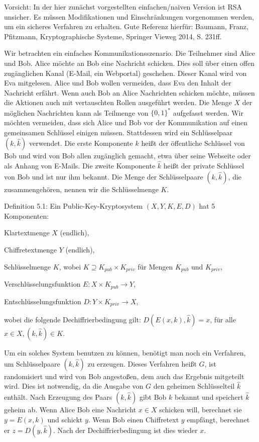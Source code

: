 \documentclass[a4paper]{article}
\begin{document}
\begin{multicols}{3}
        Vorsicht: In der hier zunächst vorgestellten einfachen/naiven Version ist RSA unsicher. Es müssen Modifikationen und Einschränkungen vorgenommen werden, um ein
        sicheres Verfahren zu erhalten. Gute Referenz hierfür: Baumann, Franz, Pfitzmann, Kryptographische Systeme, Springer Vieweg 2014, S. 231ff.

        Wir betrachten ein einfaches Kommunikationsszenario. Die Teilnehmer sind Alice und Bob. Alice möchte an Bob eine Nachricht schicken. Dies soll über einen offen zugänglichen Kanal (E-Mail, ein Webportal) geschehen. Dieser Kanal wird von Eva mitgelesen. Alice und Bob wollen vermeiden, dass Eva den Inhalt der Nachricht erfährt. Wenn auch Bob an Alice Nachrichten schicken möchte, müssen die Aktionen auch mit vertauschten Rollen ausgeführt werden.
        Die Menge $X$ der möglichen Nachrichten kann als Teilmenge von $\{0,1\}^*$ aufgefasst werden. Wir möchten vermeiden, dass sich Alice und Bob vor der Kommunikation auf einen gemeinsamen Schlüssel einigen müssen. Stattdessen wird ein Schlüsselpaar $(k,\hat{k})$ verwendet. Die erste Komponente $k$ heißt der öffentliche Schlüssel von Bob und wird von Bob allen zugänglich gemacht, etwa über seine Webseite oder als Anhang von E-Mails. Die zweite Komponente $\hat{k}$ heißt der private Schlüssel von Bob und ist nur ihm bekannt. Die Menge der Schlüsselpaare $(k,\hat{k})$, die zusammengehören, nennen wir die Schlüsselmenge $K$.

        Definition 5.1: Ein Public-Key-Kryptosystem $(X,Y,K,E,D)$ hat 5 Komponenten:
        \begin{itemize*}
            \item Klartextmenge $X$ (endlich),
            \item Chiffretextmenge $Y$ (endlich),
            \item Schlüsselmenge $K$, wobei $K\supseteq K_{pub} \times K_{priv}$ für Mengen $K_{pub}$ und $K_{priv}$,
            \item Verschlüsselungsfunktion $E:X\times K_{pub} \rightarrow Y$,
            \item Entschlüsselungsfunktion $D:Y\times K_{priv} \rightarrow X$,
            \item wobei die folgende Dechiffrierbedingung gilt: $D(E(x,k), \hat{k}) =x$, für alle $x\in X,(k,\hat{k})\in K$.
        \end{itemize*}

        Um ein solches System benutzen zu können, benötigt man noch ein Verfahren, um Schlüsselpaare $(k,\hat{k})$ zu erzeugen. Dieses Verfahren heißt $G$, ist randomisiert und wird von Bob angestoßen, dem auch das Ergebnis mitgeteilt wird. Dies ist notwendig, da die Ausgabe von $G$ den geheimen Schlüsselteil $\hat{k}$ enthält. Nach Erzeugung des Paars $(k,\hat{k})$ gibt Bob $k$ bekannt und speichert $\hat{k}$ geheim ab. Wenn Alice Bob eine Nachricht $x\in X$ schicken will, berechnet sie $y=E(x,k)$ und schickt $y$. Wenn Bob einen Chiffretext $y$ empfängt, berechnet er $z=D(y,\hat{k})$. Nach der Dechiffrierbedingung ist dies wieder $x$.


\end{multicols}
\end{document}
